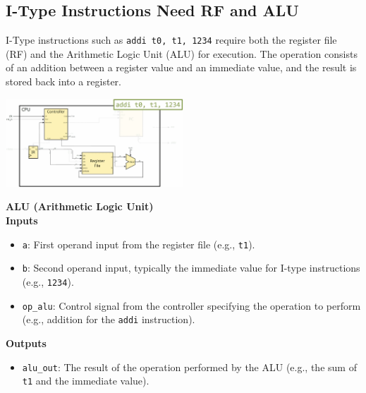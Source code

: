 \subsection{I-Type Instructions Need RF and ALU}
I-Type instructions such as \texttt{addi t0, t1, 1234} require both the register file (RF) and the Arithmetic Logic Unit (ALU) for execution. The operation consists of an addition between a register value and an immediate value, and the result is stored back into a register.
\begin{center}
    \includegraphics[width=0.5\textwidth]{chapters/chapter2a/images/p4.png}
\end{center}
\noindent
\begin{minipage}[t]{0.45\textwidth}
    \footnotesize
    \textbf{ALU (Arithmetic Logic Unit)} \\ \vspace*{5px}
        \textbf{Inputs} 
        \begin{itemize}
            \item \texttt{a}: First operand input from the register file (e.g., \texttt{t1}).
            \item \texttt{b}: Second operand input, typically the immediate value for I-type instructions (e.g., \texttt{1234}).
            \item \texttt{op\_alu}: Control signal from the controller specifying the operation to perform (e.g., addition for the \texttt{addi} instruction).
        \end{itemize}
         \textbf{Outputs}
        \begin{itemize}
            \item \texttt{alu\_out}: The result of the operation performed by the ALU (e.g., the sum of \texttt{t1} and the immediate value).
        \end{itemize}
\end{minipage}
\hfill
\vline
\hfill

